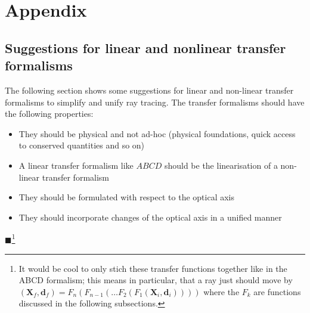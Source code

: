 \documentclass[12pt,a4paper,twoside,openright,BCOR10mm,headsepline,titlepage,abstracton,chapterprefix,final]{scrreprt}
\newcommand\Vector[1]{{\mathbf{#1}}}
\newcommand{\remark}[1]{{\color{red}$\blacksquare$}\footnote{{\color{red}#1}}}
\begin{document}
\chapter{Appendix}


\section{Suggestions for linear and nonlinear transfer formalisms}
The following section shows some suggestions for linear and non-linear transfer formalisms
to simplify and unify ray tracing. The transfer formalisms should have the following properties:

\begin{itemize}
 \item They should be physical and not ad-hoc (physical foundations, quick access to conserved quantities and so on)
 \item A linear transfer formalism like $ABCD$ should be the linearisation of a non-linear transfer formalism
 \item They should be formulated with respect to the optical axis
 \item They should incorporate changes of the optical axis in a unified manner
\end{itemize}

\remark{It would be cool to only stich these transfer functions together like in the ABCD formalism;
this means in particular, that a ray just should move by $(\Vector{X}_f, \Vector{d}_f) = F_n (F_{n-1}( \dots F_2 (F_1(\Vector{X}_i, \Vector{d}_i))))$ where
the $F_k$ are functions discussed in the following subsections.}
\end{document}
